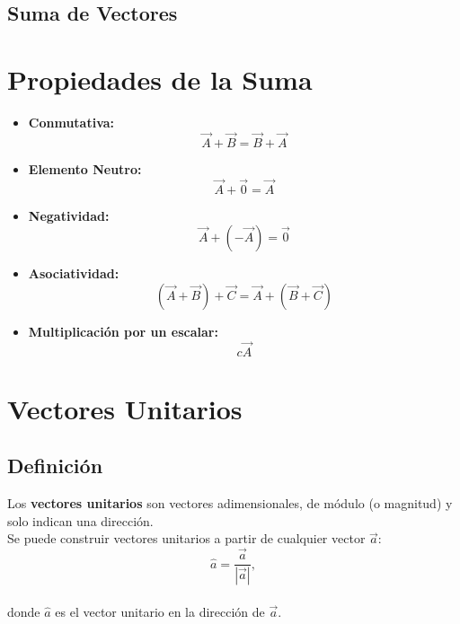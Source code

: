 \subsection{Suma de Vectores}
\begin{center}
\end{center}

\newpage
\section{Propiedades de la Suma}
\begin{itemize}
    \item \textbf{Conmutativa:}
    \[
    \vec{A} + \vec{B} = \vec{B} + \vec{A}
    \]

    \item \textbf{Elemento Neutro:}
    \[
    \vec{A} + \vec{0} = \vec{A}
    \]

    \item \textbf{Negatividad:}
    \[
    \vec{A} + (-\vec{A}) = \vec{0}
    \]

    \item \textbf{Asociatividad:}
    \[
    (\vec{A} + \vec{B}) + \vec{C} = \vec{A} + (\vec{B} + \vec{C})
    \]

    \item \textbf{Multiplicación por un escalar:}
    \[
    c \vec{A}
    \]
\end{itemize}

\newpage
\section{Vectores Unitarios}

\subsection{Definición}

Los \textbf{vectores unitarios} son vectores adimensionales, de módulo (o magnitud) y solo indican una dirección.
\\[0.5cm]
Se puede construir vectores unitarios a partir de cualquier vector $\vec{a}$:
\[
\hat{a} = \frac{\vec{a}}{|\vec{a}|},
\]
\\
donde $\hat{a}$ es el vector unitario en la dirección de $\vec{a}$.

